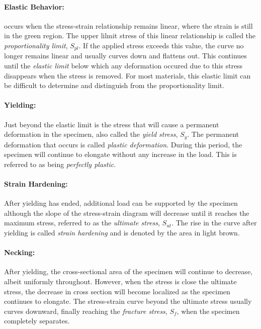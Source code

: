 \documentclass[
fontsize=10pt,
a4paper,
twosides=false,
open=any,
svgnames,
]{kaobook} %
\begin{document}
\paragraph{Elastic Behavior:} occurs when the stress-strain relationship remains linear, where the strain is still in the green region. The upper lilmit stress of this linear relationship is called the \emph{proportionality limit}, $S_{pl}$. If the applied stress exceeds this value, the curve no longer remains linear and usually curves down and flattens out. This continues until the \emph{elastic limit} below which any deformation occured due to this stress disappears when the stress is removed. For most materials, this elastic limit can be difficult to determine and distinguish from the proportionality limit.

\paragraph{Yielding:} Just beyond the elastic limit is the stress that will cause a permanent deformation in the specimen, also called the \emph{yield stress}, $S_y$. The permanent deformation that occurs is called \emph{plastic deformation}. During this period, the specimen will continue to elongate without any increase in the load. This is referred to as being \emph{perfectly plastic}.

\paragraph{Strain Hardening:} After yielding has ended, additional load can be supported by the specimen although the slope of the stress-strain diagram will decrease until it reaches the maximum stress, referred to as the \emph{ultimate stress}, $S_{ut}$. The rise in the curve after yielding is called \emph{strain hardening} and is denoted by the area in light brown.

\paragraph{Necking:} After yielding, the cross-sectional area of the specimen will continue to decrease, albeit uniformly throughout. However, when the stress is close the ultimate stress, the decrease in cross section will become localized as the specimen continues to elongate. The stress-strain curve beyond the ultimate stress usually curves downward, finally reaching the \emph{fracture stress}, $S_f$, when the specimen completely separates.
\end{document}
